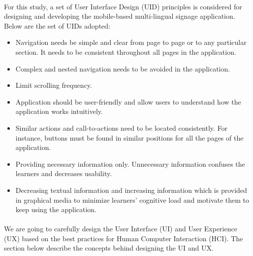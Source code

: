 \documentclass[12pt]{article}
\begin{document}
\paragraph{} For this study, a set of User Interface Design (UID) principles is considered \cite{uid} for designing and developing the mobile-based multi-lingual signage application. Below are the set of UIDs adopted:

\begin{itemize}

 \item  Navigation needs be simple and clear from page to page or to
any particular section. It needs to be
consistent throughout all pages in the application.

 \item  Complex and nested navigation needs to be avoided in the application.

 \item Limit scrolling frequency.

 \item Application should be user-friendly and allow
users to understand how the application works intuitively.

 \item Similar actions and call-to-actions need to be located consistently. For instance,  buttons must be
found in similar positions for all the pages of the
application.

 \item Providing necessary information only. Unnecessary
information confuses the learners and decreases usability.

 \item  Decreasing textual information and increasing
information which is provided in graphical media to minimize learners' cognitive load and motivate
them to keep using the application.

\end{itemize}




\paragraph{}We are going to carefully design the User Interface (UI) and User Experience (UX) based on the best practices for Human Computer Interaction (HCI). The section below describe the concepts behind designing the UI and UX.
\end{document}

